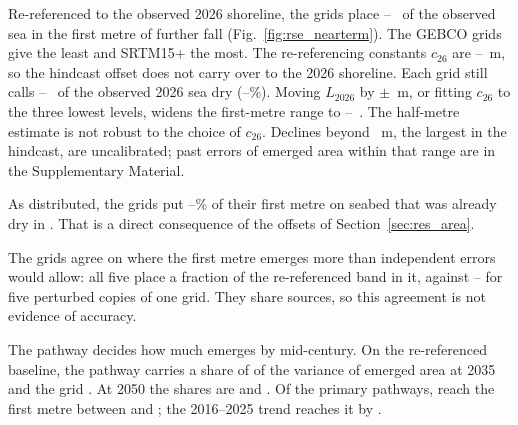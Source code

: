 Re-referenced to the observed 2026 shoreline, the grids place --~\kmsq{} of the observed sea in the first metre of further fall (Fig.~\ref{fig:rse_nearterm}). The GEBCO grids give the least and SRTM15+ the most. The re-referencing constants $c_{26}$ are --~m, so the hindcast offset does not carry over to the 2026 shoreline. Each grid still calls --~\kmsq{} of the observed 2026 sea dry (--\%). Moving $L_{2026}$ by $\pm$~m, or fitting $c_{26}$ to the three lowest levels, widens the first-metre range to --~\kmsq{}. The half-metre estimate is not robust to the choice of $c_{26}$. Declines beyond ~m, the largest in the hindcast, are uncalibrated; past errors of emerged area within that range are in the Supplementary Material. 



As distributed, the grids put --\% of their first metre on seabed that was already dry in . That is a direct consequence of the offsets of Section~\ref{sec:res_area}.

The grids agree on where the first metre emerges more than independent errors would allow: all five place a fraction  of the re-referenced band in it, against -- for five perturbed copies of one grid. They share sources, so this agreement is not evidence of accuracy.

The pathway decides how much emerges by mid-century. On the re-referenced baseline, the pathway carries a share of  of the variance of emerged area at 2035 and the grid . At 2050 the shares are  and . Of the  primary pathways,  reach the first metre between  and ; the 2016--2025 trend reaches it by .

